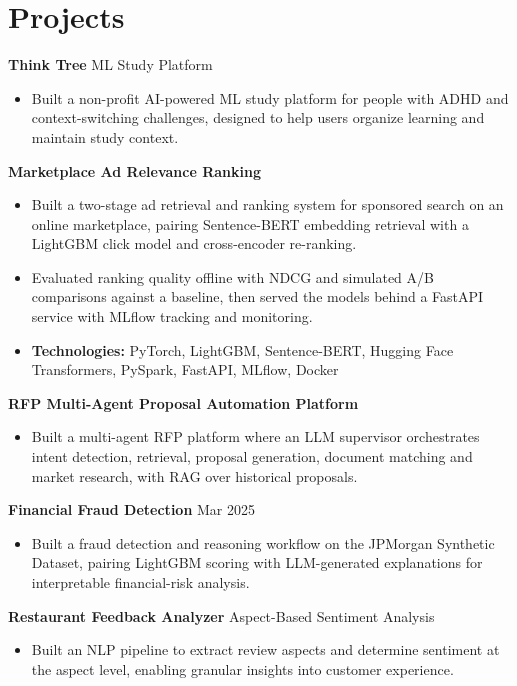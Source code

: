 \documentclass[10pt,a4paper]{article}
\begin{document}
\section{Projects}
\textbf{Think Tree} \textbar{} ML Study Platform\par
\begin{itemize}
  \item Built a non-profit AI-powered ML study platform for people with ADHD and context-switching challenges, designed to help users organize learning and maintain study context.
\end{itemize}
\textbf{Marketplace Ad Relevance Ranking}\par
\begin{itemize}
  \item Built a two-stage ad retrieval and ranking system for sponsored search on an online marketplace, pairing Sentence-BERT embedding retrieval with a LightGBM click model and cross-encoder re-ranking.
  \item Evaluated ranking quality offline with NDCG and simulated A/B comparisons against a baseline, then served the models behind a FastAPI service with MLflow tracking and monitoring.
  \item \textbf{Technologies:} PyTorch, LightGBM, Sentence-BERT, Hugging Face Transformers, PySpark, FastAPI, MLflow, Docker
\end{itemize}
\textbf{RFP Multi-Agent Proposal Automation Platform}\par
\begin{itemize}
  \item Built a multi-agent RFP platform where an LLM supervisor orchestrates intent detection, retrieval, proposal generation, document matching and market research, with RAG over historical proposals.
\end{itemize}
\textbf{Financial Fraud Detection} \textbar{} Mar 2025\par
\begin{itemize}
  \item Built a fraud detection and reasoning workflow on the JPMorgan Synthetic Dataset, pairing LightGBM scoring with LLM-generated explanations for interpretable financial-risk analysis.
\end{itemize}
\textbf{Restaurant Feedback Analyzer} \textbar{} Aspect-Based Sentiment Analysis\par
\begin{itemize}
  \item Built an NLP pipeline to extract review aspects and determine sentiment at the aspect level, enabling granular insights into customer experience.
\end{itemize}
\end{document}
